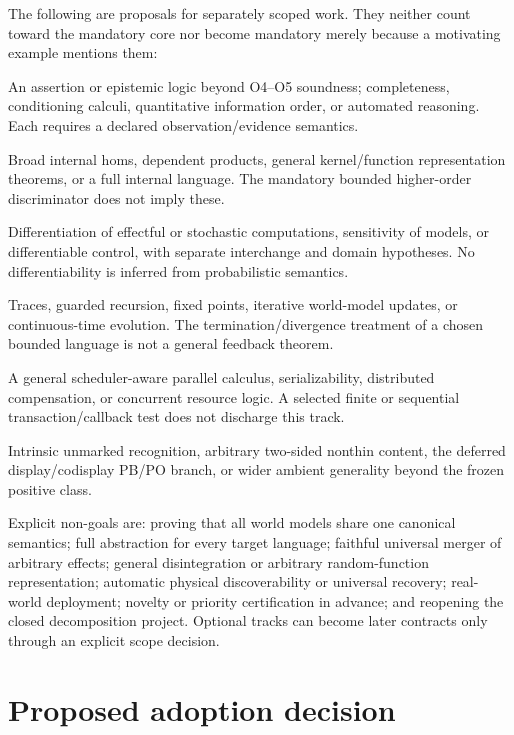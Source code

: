 \documentclass[11pt,a4paper]{article}
\begin{document}
The following are proposals for separately scoped work. They neither count
toward the mandatory core nor become mandatory merely because a motivating
example mentions them:
\begin{description}[style=nextline]
\item[Rich logic and inference.]
An assertion or epistemic logic beyond O4--O5 soundness; completeness,
conditioning calculi, quantitative information order, or automated reasoning.
Each requires a declared observation/evidence semantics.
\item[Closed and dependent higher-order structure.]
Broad internal homs, dependent products, general kernel/function
representation theorems, or a full internal language. The mandatory bounded
higher-order discriminator does not imply these.
\item[Differential structure.]
Differentiation of effectful or stochastic computations, sensitivity of
models, or differentiable control, with separate interchange and domain
hypotheses. No differentiability is inferred from probabilistic semantics.
\item[Feedback and recursion.]
Traces, guarded recursion, fixed points, iterative world-model updates, or
continuous-time evolution. The termination/divergence treatment of a chosen
bounded language is not a general feedback theorem.
\item[Concurrency and transactions.]
A general scheduler-aware parallel calculus, serializability, distributed
compensation, or concurrent resource logic. A selected finite or sequential
transaction/callback test does not discharge this track.
\item[Additional structural recognition.]
Intrinsic unmarked recognition, arbitrary two-sided nonthin content,
the deferred display/codisplay PB/PO branch, or wider ambient generality
beyond the frozen positive class.
\end{description}

Explicit non-goals are: proving that all world models share one canonical
semantics; full abstraction for every target language; faithful universal
merger of arbitrary effects; general disintegration or arbitrary random-function
representation; automatic physical discoverability or universal recovery;
real-world deployment; novelty or priority certification in advance; and
reopening the closed decomposition project. Optional tracks can become later
contracts only through an explicit scope decision.

\section*{Proposed adoption decision}
\end{document}
